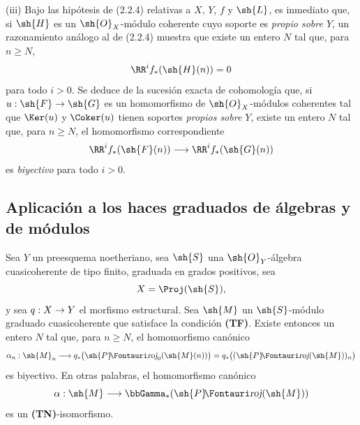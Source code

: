\documentclass[oneside]{amsart}
\makeatletter
\renewcommand{\geq}{\geqslant}
\newcommand{\ega@arrow}[2]{\mathchoice{#1}{#2}{#2}{#2}}
\renewcommand{\to}{\ega@arrow{\longrightarrow}{\rightarrow}}
\newcommand*{\ega@sheafop}[3]{\sh{#1}#2\textup{\kern-2.2pt{\Fontauri\slshape #3}}}
\newcommand*{\shProj}{\ega@sheafop{P}{}{roj}}
\newcommand{\oldpage}[2][]{{\marginnote{\normalfont\textbf{#1}~|~#2}}\ignorespaces}
\let\EGAOriginalLabel\label
\renewcommand{\label}[1]{\phantomsection\EGAOriginalLabel{#1}}
\makeatother
\begin{document}
\begin{env}[2.2.5]
(iii) Bajo las hipótesis de (2.2.4) relativas a $X$, $Y$, $f$ y $\sh{L}$, es inmediato que, si $\sh{H}$ es un $\sh{O}_X$-módulo coherente cuyo soporte es \emph{propio sobre $Y$}, un razonamiento análogo al de (2.2.4) muestra que existe un entero $N$ tal que, para $n\geq N$,
\[
  \RR^i f_*(\sh{H}(n))=0
\]
para todo $i>0$. Se deduce de la sucesión exacta de cohomología que, si $u:\sh{F}\to\sh{G}$ es un homomorfismo de $\sh{O}_X$-módulos coherentes tal que $\Ker(u)$ y $\Coker(u)$ tienen soportes \emph{propios sobre $Y$}, existe un entero $N$ tal que, para $n\geq N$, el homomorfismo correspondiente
\[
  \RR^i f_*(\sh{F}(n))\to\RR^i f_*(\sh{G}(n))
\]
es \emph{biyectivo} para todo $i>0$.
\end{env}


\subsection{Aplicación a los haces graduados de álgebras y de módulos}
\label{subsection:III.2.3}

\begin{theorem}[2.3.1]
\label{III.2.3.1}
Sea $Y$ un preesquema noetheriano, sea $\sh{S}$ una $\sh{O}_Y$-álgebra cuasicoherente de tipo finito, graduada en grados positivos, sea
\[
  X=\Proj(\sh{S}),
\]
y sea $q:X\to Y$ el morfismo estructural.
Sea $\sh{M}$ un $\sh{S}$-módulo graduado cuasicoherente que satisface la condición \textup{\textbf{(TF)}}.
Existe entonces un entero $N$ tal que, para $n\geq N$, el homomorfismo canónico \textup{}
\[
  \alpha_n:\sh{M}_n
  \longrightarrow q_*\bigl(\shProj_0(\sh{M}(n))\bigr)
  =q_*\bigl((\shProj(\sh{M}))_n\bigr)
\]
\oldpage[III]{103}
es biyectivo.
En otras palabras, el homomorfismo canónico
\[
  \alpha:\sh{M}\longrightarrow\bbGamma_*(\shProj(\sh{M}))
\]
es un \textup{\textbf{(TN)}}-isomorfismo.
\end{theorem}
\end{document}
